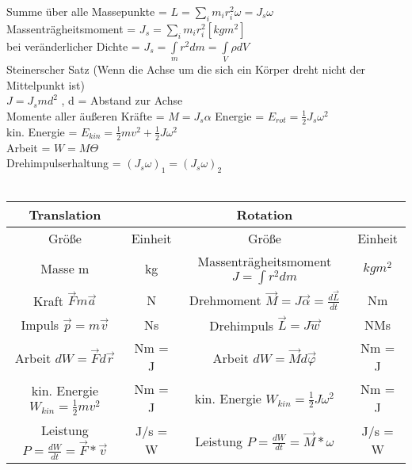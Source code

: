 \documentclass[8pt]{article}
\begin{document}
Summe über alle Massepunkte = $L=\sum_i m_i r_i^2 \omega = J_s \omega$\\
Massenträgheitsmoment = 
$J_s = \sum_i m_i r_i^2 [kgm^2]$\\
bei veränderlicher Dichte = $J_s = \int \limits_m r^2dm = \int \limits_V \rho dV$\\
Steinerscher Satz (Wenn die Achse um die sich ein Körper dreht nicht der Mittelpunkt ist)\\
$J = J_s md^2$ , d = Abstand zur Achse \\
Momente aller äußeren Kräfte = $M = J_s \alpha$
Energie = $E_{rot} = \frac{1}{2}J_s \omega^2$ \\
kin. Energie = $E_{kin}=\frac{1}{2}mv^2+\frac{1}{2}J\omega^2$ \\
Arbeit = $W = M\Theta$ \\
Drehimpulserhaltung  = $(J_s\omega)_1 = (J_s\omega)_2$ \\ \\
\noindent
\begin{tabular}{|c|c|c|c|}
\hline 
Translation &  & Rotation &  \\ 
\hline 
Größe & Einheit & Größe & Einheit \\ 
\hline 
Masse m & kg & Massenträgheitsmoment $J=\int r^2 dm$  & $kgm^2$ \\ 
\hline 
Kraft $\overrightarrow{F} m \overrightarrow{a}$ & N & Drehmoment $\overrightarrow{M} = J\overrightarrow{\alpha} = \frac{d\overrightarrow{L}}{dt}$ & Nm \\ 
\hline 
Impuls $\overrightarrow{p}=m\overrightarrow{v}$& Ns & Drehimpuls $\overrightarrow{L} = J\overrightarrow{w}$ & NMs \\ 
\hline 
Arbeit $dW = \overrightarrow{F}d\overrightarrow{r}$ & Nm = J & Arbeit $dW = \overrightarrow{M}d\overrightarrow{\varphi}$ & Nm = J \\ 
\hline 
kin. Energie $W_{kin}=\frac{1}{2}mv^2$ & Nm = J & kin. Energie $W_{kin} = \frac{1}{2}J\omega^2$ & Nm = J\\ 
\hline 
Leistung $P=\frac{dW}{dt}=\overrightarrow{F}*\overrightarrow{v}$ & J/s = W & Leistung $P=\frac{dW}{dt}=\overrightarrow{M}*\omega$ & J/s = W \\ 
\hline 
\end{tabular} 
\end{document}
